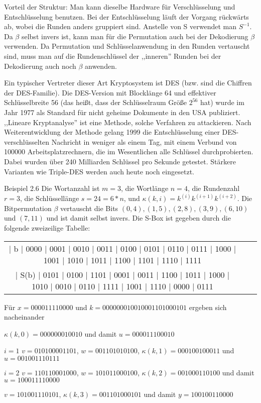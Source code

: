 \documentclass[a4paper]{article}
\begin{document}
\begin{multicols}{3}
    Vorteil der Struktur: Man kann dieselbe Hardware für Verschlüsselung und Entschlüsselung benutzen. Bei der Entschlüsselung läuft der Vorgang rückwärts ab, wobei die Runden anders gruppiert sind. Anstelle von S verwendet man $S^{-1}$. Da $\beta$ selbst invers ist, kann man für die Permutation auch bei der Dekodierung $\beta$ verwenden. Da Permutation und Schlüsselanwendung in den Runden vertauscht sind, muss man auf die Rundenschlüssel der ,,inneren'' Runden bei der Dekodierung auch noch $\beta$ anwenden.

    Ein typischer Vertreter dieser Art Kryptosystem ist DES (bzw. sind die Chiffren der DES-Familie). Die DES-Version mit Blocklänge 64 und effektiver Schlüsselbreite 56 (das heißt, dass der Schlüsselraum Größe $2^{56}$ hat) wurde im Jahr 1977 als Standard für nicht geheime Dokumente in den USA publiziert. ,,Lineare Kryptanalyse'' ist eine Methode, solche Verfahren zu attackieren. Nach Weiterentwicklung der Methode gelang 1999 die Entschlüsselung einer DES-verschlüsselten Nachricht in weniger als einem Tag, mit einem Verbund von 100000 Arbeitsplatzrechnern, die im Wesentlichen alle Schlüssel durchprobierten. Dabei wurden über 240 Milliarden Schlüssel pro Sekunde getestet. Stärkere Varianten wie Triple-DES werden auch heute noch eingesetzt.

    Beispiel 2.6 Die Wortanzahl ist $m=3$, die Wortlänge $n=4$, die Rundenzahl $r=3$, die Schlüssellänge $s=24=6*n$, und $\kappa (k,i)=k^{(i)}k^{(i+1)}k^{(i+2)}$. Die Bitpermutation $\beta$ vertauscht die Bits $(0,4),(1,5),(2,8),(3,9),(6,10)$ und $(7,11)$ und ist damit selbst invers. Die S-Box ist gegeben durch die folgende zweizeilige Tabelle:
    \begin{tabular}{c|c|c}
        | b  | 0000 | 0001 | 0010 | 0011 | 0100 | 0101 | 0110 | 0111 | 1000 | 1001 | 1010 | 1011 | 1100 | 1101 | 1110 | 1111 \\
        | S(b) | 0101 | 0100 | 1101 | 0001 | 0011 | 1100 | 1011 | 1000 | 1010 | 0010 | 0110 | 1111 | 1001 | 1110 | 0000 | 0111
    \end{tabular}

    Für $x= 0000 1111 0000$ und $k=0000 0001 0010 0011 0100 0101$ ergeben sich nacheinander
    \begin{enumerate*}
        \item $\kappa (k,0) = 0000 0001 0010$ und damit $u= 0000 1110 0010$
        \item
        \begin{itemize*}
            \item $i=1$ $v=0101 0000 1101$, $w=0011 0101 0100$, $\kappa (k,1) = 0001 0010 0011$ und $u=0010 0111 0111$
            \item $i=2$ $v=1101 1000 1000$, $w=1010 1100 0100$, $\kappa (k,2) = 0010 0011 0100$ und damit $u= 1000 1111 0000$
        \end{itemize*}
        \item $v=1010 0111 0101$, $\kappa (k,3) = 0011 0100 0101$ und damit $y=1001 0011 0000$
    \end{enumerate*}



\end{multicols}
\end{document}
